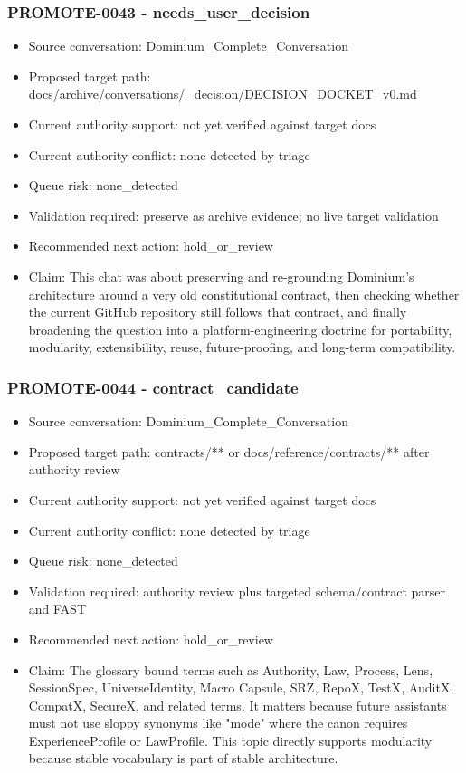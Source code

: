 \documentclass[11pt,a4paper]{report}
\begin{document}
\subsubsection{PROMOTE-0043 - needs\_user\_decision}

\begin{itemize}
\item Source conversation: Dominium\_Complete\_Conversation
\item Proposed target path: docs/archive/conversations/\_decision/DECISION\_DOCKET\_v0.md
\item Current authority support: not yet verified against target docs
\item Current authority conflict: none detected by triage
\item Queue risk: none\_detected
\item Validation required: preserve as archive evidence; no live target validation
\item Recommended next action: hold\_or\_review
\item Claim: This chat was about preserving and re-grounding Dominium's architecture around a very old constitutional contract, then checking whether the current GitHub repository still follows that contract, and finally broadening the question into a platform-engineering doctrine for portability, modularity, extensibility, reuse, future-proofing, and long-term compatibility.
\end{itemize}

\subsubsection{PROMOTE-0044 - contract\_candidate}

\begin{itemize}
\item Source conversation: Dominium\_Complete\_Conversation
\item Proposed target path: contracts/** or docs/reference/contracts/** after authority review
\item Current authority support: not yet verified against target docs
\item Current authority conflict: none detected by triage
\item Queue risk: none\_detected
\item Validation required: authority review plus targeted schema/contract parser and FAST
\item Recommended next action: hold\_or\_review
\item Claim: The glossary bound terms such as Authority, Law, Process, Lens, SessionSpec, UniverseIdentity, Macro Capsule, SRZ, RepoX, TestX, AuditX, CompatX, SecureX, and related terms. It matters because future assistants must not use sloppy synonyms like "mode" where the canon requires ExperienceProfile or LawProfile. This topic directly supports modularity because stable vocabulary is part of stable architecture.
\end{itemize}
\end{document}
